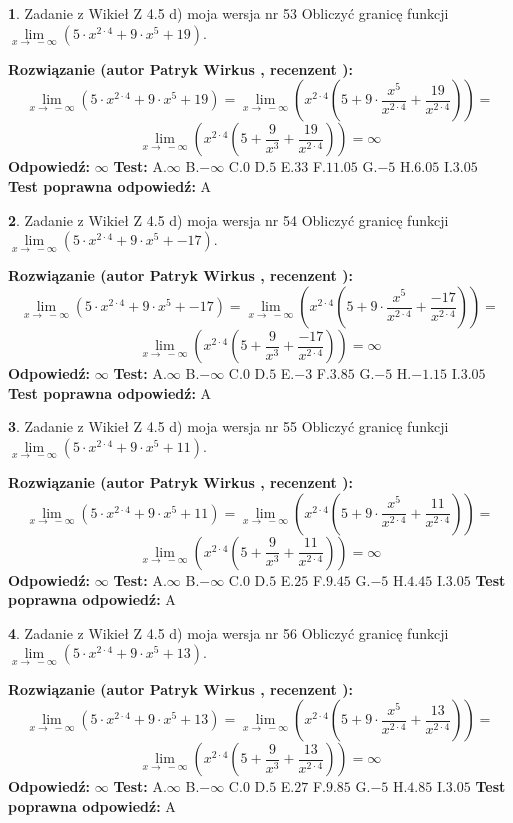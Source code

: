 \documentclass[12pt, a4paper]{article}
\theoremstyle{definition} %
\newtheorem{zad}{}
\newcommand{\zadStart}[1]{\begin{zad}#1\newline}
\newcommand{\zadStop}{\end{zad}}
\newcommand{\rozwStart}[2]{\noindent \textbf{Rozwiązanie (autor #1 , recenzent #2): }\newline}
\newcommand{\rozwStop}{\newline}
\newcommand{\odpStart}{\noindent \textbf{Odpowiedź:}\newline}
\newcommand{\odpStop}{\newline}
\newcommand{\testStart}{\noindent \textbf{Test:}\newline}
\newcommand{\testStop}{\newline}
\newcommand{\kluczStart}{\noindent \textbf{Test poprawna odpowiedź:}\newline}
\newcommand{\kluczStop}{\newline}
\begin{document}
\zadStart{Zadanie z Wikieł Z 4.5 d) moja wersja nr 53}
Obliczyć granicę funkcji  $\lim\limits_{x\to\ -\infty}(5 \cdot x^{2\cdot4}+9 \cdot x^{5}+19)$.
\zadStop
\rozwStart{Patryk Wirkus}{}
$$\lim\limits_{x\to\ -\infty}(5 \cdot x^{2\cdot4}+9 \cdot x^{5}+19) = \lim\limits_{x\to\ -\infty}(x^{2\cdot4}(5 +9 \cdot \frac{x^{5}}{x^{2\cdot4}}+\frac{19}{x^{2\cdot4}})) =$$ $$\lim\limits_{x\to\ -\infty}(x^{2\cdot4}(5 +\frac{9}{x^{3}}+\frac{19}{x^{2\cdot4}})) =\infty$$
\rozwStop
\odpStart
$\infty$
\odpStop
\testStart
A.$\infty$ B.$-\infty$ C.$0$ D.$5$ E.$33$
F.$11.05$ G.$-5$
H.$6.05$
I.$3.05$
\testStop
\kluczStart
A
\kluczStop



\zadStart{Zadanie z Wikieł Z 4.5 d) moja wersja nr 54}
Obliczyć granicę funkcji  $\lim\limits_{x\to\ -\infty}(5 \cdot x^{2\cdot4}+9 \cdot x^{5}+-17)$.
\zadStop
\rozwStart{Patryk Wirkus}{}
$$\lim\limits_{x\to\ -\infty}(5 \cdot x^{2\cdot4}+9 \cdot x^{5}+-17) = \lim\limits_{x\to\ -\infty}(x^{2\cdot4}(5 +9 \cdot \frac{x^{5}}{x^{2\cdot4}}+\frac{-17}{x^{2\cdot4}})) =$$ $$\lim\limits_{x\to\ -\infty}(x^{2\cdot4}(5 +\frac{9}{x^{3}}+\frac{-17}{x^{2\cdot4}})) =\infty$$
\rozwStop
\odpStart
$\infty$
\odpStop
\testStart
A.$\infty$ B.$-\infty$ C.$0$ D.$5$ E.$-3$
F.$3.85$ G.$-5$
H.$-1.15$
I.$3.05$
\testStop
\kluczStart
A
\kluczStop



\zadStart{Zadanie z Wikieł Z 4.5 d) moja wersja nr 55}
Obliczyć granicę funkcji  $\lim\limits_{x\to\ -\infty}(5 \cdot x^{2\cdot4}+9 \cdot x^{5}+11)$.
\zadStop
\rozwStart{Patryk Wirkus}{}
$$\lim\limits_{x\to\ -\infty}(5 \cdot x^{2\cdot4}+9 \cdot x^{5}+11) = \lim\limits_{x\to\ -\infty}(x^{2\cdot4}(5 +9 \cdot \frac{x^{5}}{x^{2\cdot4}}+\frac{11}{x^{2\cdot4}})) =$$ $$\lim\limits_{x\to\ -\infty}(x^{2\cdot4}(5 +\frac{9}{x^{3}}+\frac{11}{x^{2\cdot4}})) =\infty$$
\rozwStop
\odpStart
$\infty$
\odpStop
\testStart
A.$\infty$ B.$-\infty$ C.$0$ D.$5$ E.$25$
F.$9.45$ G.$-5$
H.$4.45$
I.$3.05$
\testStop
\kluczStart
A
\kluczStop



\zadStart{Zadanie z Wikieł Z 4.5 d) moja wersja nr 56}
Obliczyć granicę funkcji  $\lim\limits_{x\to\ -\infty}(5 \cdot x^{2\cdot4}+9 \cdot x^{5}+13)$.
\zadStop
\rozwStart{Patryk Wirkus}{}
$$\lim\limits_{x\to\ -\infty}(5 \cdot x^{2\cdot4}+9 \cdot x^{5}+13) = \lim\limits_{x\to\ -\infty}(x^{2\cdot4}(5 +9 \cdot \frac{x^{5}}{x^{2\cdot4}}+\frac{13}{x^{2\cdot4}})) =$$ $$\lim\limits_{x\to\ -\infty}(x^{2\cdot4}(5 +\frac{9}{x^{3}}+\frac{13}{x^{2\cdot4}})) =\infty$$
\rozwStop
\odpStart
$\infty$
\odpStop
\testStart
A.$\infty$ B.$-\infty$ C.$0$ D.$5$ E.$27$
F.$9.85$ G.$-5$
H.$4.85$
I.$3.05$
\testStop
\kluczStart
A
\kluczStop
\end{document}
